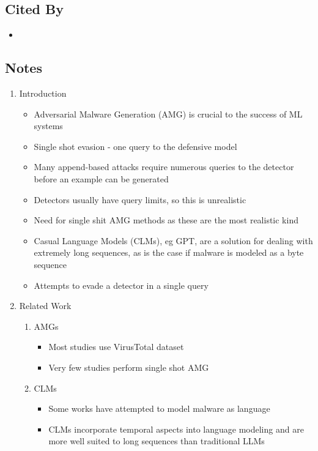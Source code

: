 \documentclass{article}
\begin{document}
\subsection*{Cited By}
\begin{itemize}
	\item
\end{itemize}

\subsection*{Notes}

\begin{enumerate}
	\item Introduction
	\begin{itemize}
		\item Adversarial Malware Generation (AMG) is crucial to the success of ML systems
		\item Single shot evasion - one query to the defensive model
		\item Many append-based attacks require numerous queries to the detector before an example can be generated
		\item Detectors usually have query limits, so this is unrealistic
		\item Need for single shit AMG methods as these are the most realistic kind
		\item Casual Language Models (CLMs), eg GPT, are a solution for dealing with extremely long sequences, as is the case if malware is modeled as a byte sequence
		\item Attempts to evade a detector in a single query
	\end{itemize}
	\item Related Work
	\begin{enumerate}
		\item AMGs
		\begin{itemize}
			\item Most studies use VirusTotal dataset
			\item Very few studies perform single shot AMG
		\end{itemize}
		\item CLMs
		\begin{itemize}
			\item Some works have attempted to model malware as language
			\item CLMs incorporate temporal aspects into language modeling and are more well suited to long sequences than traditional LLMs
		\end{itemize}

\end{enumerate}
\end{enumerate}
\end{document}
